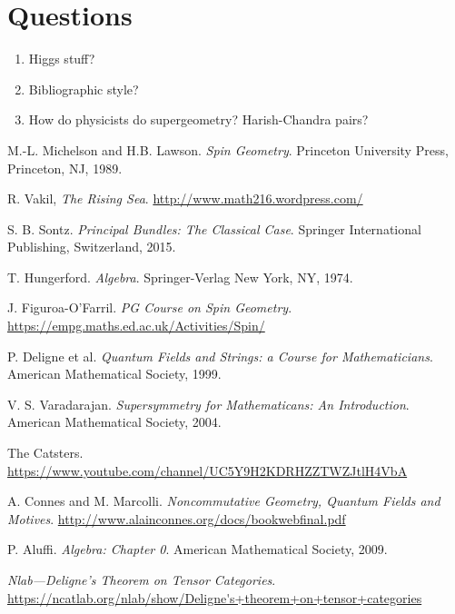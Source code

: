 \documentclass[a4paper,10pt]{scrreprt}
\theoremstyle{definition}
\theoremstyle{plain}
\theoremstyle{remark}
\begin{document}
\chapter{Questions}
\begin{enumerate}
  \item Higgs stuff?

  \item Bibliographic style?

  \item How do physicists do supergeometry? Harish-Chandra pairs?
\end{enumerate}
\begin{thebibliography}{9}
   M.-L. Michelson and H.B. Lawson.
    \textit{Spin Geometry}.
    Princeton University Press, Princeton, NJ, 1989.

   R. Vakil,
    \textit{The Rising Sea}.
    \url{http://www.math216.wordpress.com/}

   S. B. Sontz.
    \textit{Principal Bundles: The Classical Case}.
    Springer International Publishing, Switzerland, 2015.

   T. Hungerford.
    \textit{Algebra}.
    Springer-Verlag New York, NY, 1974.

   J. Figuroa-O'Farril. 
    \textit{PG Course on Spin Geometry}.
    \url{https://empg.maths.ed.ac.uk/Activities/Spin/}

   P. Deligne et al.
    \textit{Quantum Fields and Strings: a Course for Mathematicians}.
    American Mathematical Society, 1999.

   V. S. Varadarajan.
    \textit{Supersymmetry for Mathematicans: An Introduction}.
    American Mathematical Society, 2004.

   The Catsters.
    \url{https://www.youtube.com/channel/UC5Y9H2KDRHZZTWZJtlH4VbA}

   A. Connes and M. Marcolli.
    \textit{Noncommutative Geometry, Quantum Fields and Motives}.
    \url{http://www.alainconnes.org/docs/bookwebfinal.pdf}

   P. Aluffi.
    \textit{Algebra: Chapter 0}.
    American Mathematical Society, 2009.

    \textit{Nlab---Deligne's Theorem on Tensor Categories}.
    \url{https://ncatlab.org/nlab/show/Deligne's+theorem+on+tensor+categories}


\end{thebibliography}
\end{document}
